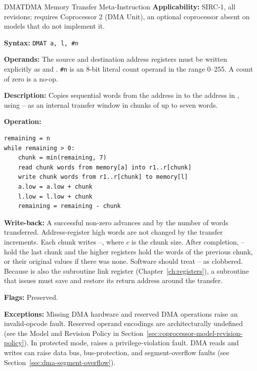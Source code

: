 \begin{instructionbox}{DMAT}{DMA Memory Transfer Meta-Instruction}
	\textbf{Applicability:} SIRC-1, all revisions; requires Coprocessor 2 (DMA Unit), an optional coprocessor absent
	on models that do not implement it.

	\textbf{Syntax:} \texttt{DMAT a, l, \#n}

	\textbf{Operands:} The source and destination address registers must be written explicitly as  and .
	\texttt{\#n} is an 8-bit literal count operand in the range 0--255. A count of zero is a no-op.

	\textbf{Description:} Copies sequential words from the address in  to the address in , using
	-- as an internal transfer window in chunks of up to seven words.

	\textbf{Operation:}
	\begin{verbatim}
remaining = n
while remaining > 0:
    chunk = min(remaining, 7)
    read chunk words from memory[a] into r1..r[chunk]
    write chunk words from r1..r[chunk] to memory[l]
    a.low = a.low + chunk
    l.low = l.low + chunk
    remaining = remaining - chunk
\end{verbatim}

	\textbf{Write-back:} A successful non-zero  advances  and  by the number of words
	transferred. Address-register high words are not changed by the transfer increments. Each chunk writes
	--, where $c$ is the chunk size. After completion, -- hold the last chunk and the
	higher registers hold the words of the previous chunk, or their original values if there was none. Software should
	treat -- as clobbered. Because  is also the subroutine link
	register (Chapter~\ref{ch:registers}), a subroutine that issues  must save and restore its return
	address around the transfer.

	\textbf{Flags:} Preserved.

	\textbf{Exceptions:} Missing DMA hardware and reserved DMA operations raise an invalid-opcode fault. Reserved
	operand encodings are architecturally undefined (see the Model and Revision Policy in Section~\ref{sec:coprocessor-model-revision-policy}).
	In protected mode, raises a privilege-violation fault. DMA reads and writes can raise data
	bus, bus-protection, and segment-overflow faults (see Section~\ref{sec:dma-segment-overflow}).


\end{instructionbox}
